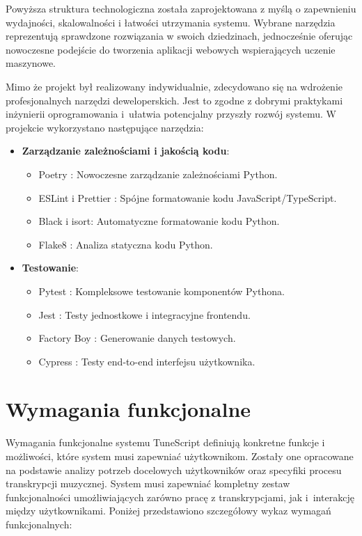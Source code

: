 \documentclass[a4paper,twoside,12pt]{book}
\begin{document}
Powyższa struktura technologiczna została zaprojektowana z myślą o zapewnieniu wydajności, skalowalności i łatwości utrzymania systemu. Wybrane narzędzia reprezentują sprawdzone rozwiązania w swoich dziedzinach, jednocześnie oferując nowoczesne podejście do tworzenia aplikacji webowych wspierających uczenie maszynowe.

Mimo że projekt był realizowany indywidualnie, zdecydowano się na wdrożenie profesjonalnych narzędzi deweloperskich. Jest to zgodne z dobrymi praktykami inżynierii oprogramowania i~ułatwia potencjalny przyszły rozwój systemu. W projekcie wykorzystano następujące narzędzia:
\begin{itemize}
    \item \textbf{Zarządzanie zależnościami i jakością kodu}:
          \begin{itemize}
            \item Poetry \cite{bib:poetry}: Nowoczesne zarządzanie zależnościami Python.
            \item ESLint \cite{bib:eslint} i Prettier \cite{bib:prettier}: Spójne formatowanie kodu JavaScript/TypeScript.
            \item Black \cite{bib:black} i isort\cite{bib:isort}: Automatyczne formatowanie kodu Python.
            \item Flake8 \cite{bib:flake8}: Analiza statyczna kodu Python.
          \end{itemize}
    \item \textbf{Testowanie}:
          \begin{itemize}
            \item Pytest \cite{bib:pytest}: Kompleksowe testowanie komponentów Pythona.
            \item Jest \cite{bib:jest}: Testy jednostkowe i integracyjne frontendu.
            \item Factory Boy \cite{bib:factoryboy}: Generowanie danych testowych.
            \item Cypress \cite{bib:cypress}: Testy end-to-end interfejsu użytkownika.
          \end{itemize}
\end{itemize}

\section{Wymagania funkcjonalne}

Wymagania funkcjonalne systemu TuneScript definiują konkretne funkcje i możliwości, które system musi zapewniać użytkownikom. Zostały one opracowane na podstawie analizy potrzeb docelowych użytkowników oraz specyfiki procesu transkrypcji muzycznej. System musi zapewniać kompletny zestaw funkcjonalności umożliwiających zarówno pracę z transkrypcjami, jak i~interakcję między użytkownikami. Poniżej przedstawiono szczegółowy wykaz wymagań funkcjonalnych:
\end{document}
